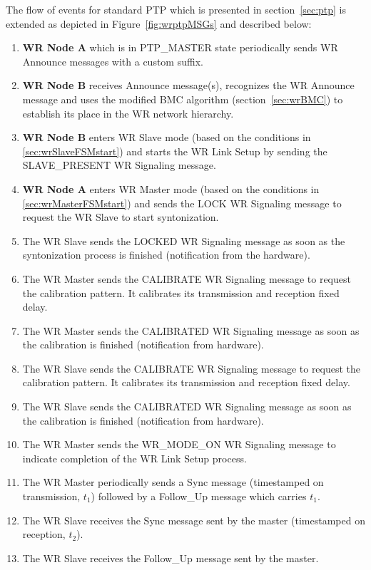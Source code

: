\documentclass[a4paper, 12pt]{article}
\begin{document}
The flow of events for standard PTP which is presented in section~\ref{sec:ptp} is extended 
as depicted in Figure~\ref{fig:wrptpMSGs} and described below:
\newpage
\begin{enumerate}
\item \textbf{WR Node A} which is in PTP\_MASTER state periodically sends WR Announce messages with 
      a custom suffix.
\item \textbf{WR Node B} receives Announce message(s), recognizes the WR Announce message and 
      uses the modified BMC algorithm (section~\ref{sec:wrBMC}) to establish its place in the WR 
      network hierarchy.
\item \textbf{WR Node B} enters WR Slave mode (based on the conditions in 
      \ref{sec:wrSlaveFSMstart}) and starts the WR Link Setup by sending the SLAVE\_PRESENT 
      WR Signaling message.
\item \textbf{WR Node A} enters WR Master mode (based on the conditions in 
      \ref{sec:wrMasterFSMstart}) and sends the LOCK WR Signaling message to request the WR Slave 
      to start syntonization.
\item The WR Slave sends the LOCKED WR Signaling message as soon as the syntonization process is 
finished (notification from the hardware).
\item The WR Master sends the CALIBRATE WR Signaling message to request the calibration pattern. 
It calibrates its transmission and reception fixed delay.
\item The WR Master sends the CALIBRATED WR Signaling message as soon as the calibration is 
finished (notification from hardware).
\item The WR Slave sends the CALIBRATE WR Signaling message to request the calibration pattern. 
It calibrates its transmission and reception fixed delay.
\item The WR Slave sends the CALIBRATED WR Signaling message as soon as the calibration is 
finished (notification from hardware).
\item The WR Master sends the WR\_MODE\_ON WR Signaling message to indicate completion of  the WR
Link Setup process.
\item The WR Master periodically sends a Sync message (timestamped on transmission, $t_1$)  followed
by a Follow\_Up message which carries $t_1$.
\item The WR Slave receives the Sync message sent by the master (timestamped on reception, $t_2$).
\item The WR Slave receives the Follow\_Up message sent by the master.

\end{enumerate}
\end{document}
